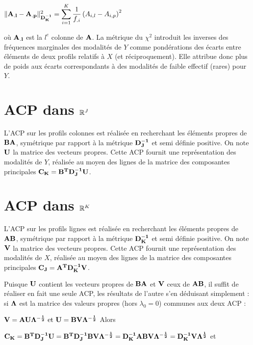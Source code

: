 \documentclass[letterpaper,10pt,english]{jupyterBook}
\begin{document}
\sphinxAtStartPar
\(\Vert {\bf A_{.l}}-{\bf A_{.p}}\Vert^2_{{\bf D_K^{-1}}} = \displaystyle\sum_{i=1}^K\frac{1}{f_{.i}}\left (A_{i,l}-A_{i,p} \right )^2\)

\sphinxAtStartPar
où \({\bf A_{.l}}\) est la \(l^e\) colonne de \({\bf A}\). La métrique du \(\chi^2\) introduit les inverses
des fréquences marginales des modalités de \(Y\) comme pondérations des écarts
entre éléments de deux profils relatifs à \(X\) (et réciproquement). Elle attribue
donc plus de poids aux écarts correspondants à des modalités de faible effectif
(rares) pour \(Y\).


\section{ACP dans \protect\(\mathbb{R}^J\protect\)}
\label{\detokenize{afc:acp-dans-mathbb-r-j}}
\sphinxAtStartPar
L’ACP sur les profils colonnes est réalisée en recherchant les éléments propres de \({\bf BA}\), symétrique par rapport à la métrique \({\bf D_J^{-1}}\) et semi définie positive. On note \(\bf U\) la matrice des vecteurs propres. Cette ACP fournit une représentation des modalités de \(Y\), réalisée au moyen des lignes de la matrice des composantes principales \({\bf C_K}={\bf B^TD_J^{-1}U}\).


\section{ACP dans \protect\(\mathbb{R}^K\protect\)}
\label{\detokenize{afc:acp-dans-mathbb-r-k}}
\sphinxAtStartPar
L’ACP sur les profils lignes est réalisée en recherchant les éléments propres de \({\bf AB}\), symétrique par rapport à la métrique \({\bf D_K^{-1}}\) et semi définie positive. On note \(\bf V\) la matrice des vecteurs propres. Cette ACP fournit une représentation des modalités de \(X\), réalisée au moyen des lignes de la matrice des composantes principales \({\bf C_J}={\bf A^TD_K^{-1}V}\).

\sphinxAtStartPar
Puisque \(\bf U\) contient les vecteurs propres de \({\bf BA}\) et \(\bf V\) ceux de \({\bf AB}\), il suffit de réaliser en fait une seule ACP, les résultats de l’autre s’en déduisant simplement : si \(\bf \Lambda\) est la matrice des valeurs propres (hors \(\lambda_0=0\)) communes aux deux ACP :

\sphinxAtStartPar
\({\bf V} ={\bf AU\Lambda^{-\frac{1}{2}}}\textrm {  et  } {\bf U} ={\bf BV\Lambda^{-\frac{1}{2}}}\)
Alors

\sphinxAtStartPar
\({\bf C_K}={\bf B^TD_J^{-1}U }= {\bf B^TD_J^{-1}BV\Lambda^{-\frac{1}{2}}} = {\bf D_K^{-1}ABV \Lambda^{-\frac{1}{2}}} =  {\bf D_K^{-1}V \Lambda^{\frac{1}{2}}}\)
et
\end{document}
